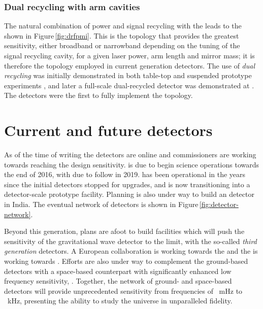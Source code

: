 \subsubsection{Dual recycling with \FP{} arm cavities}
The natural combination of power and signal recycling with the \FPMI{} leads to the \emph{\DRFPMI{}} shown in Figure\,\ref{fig:drfpmi}. This is the topology that provides the greatest sensitivity, either broadband or narrowband depending on the tuning of the signal recycling cavity, for a given laser power, arm length and mirror mass; it is therefore the topology employed in current generation detectors. The use of \emph{dual recycling} was initially demonstrated in both table-top and suspended prototype experiments \cite{Strain1991, Heinzel1998, Freise2000}, and later a full-scale dual-recycled \MI{} detector was demonstrated at \GEO{} \cite{Heinzel2002, Grote2004}. The \ALIGO{} detectors were the first to fully implement the \DRFPMI{} topology.

\section{Current and future detectors}
As of the time of writing the \ALIGO{} detectors are online and commissioners are working towards reaching the design sensitivity. \AVIRGO{} is due to begin science operations towards the end of 2016, with \KAGRA{} due to follow in 2019. \GEOHF{} has been operational in the years since the initial detectors stopped for upgrades, and is now transitioning into a detector-scale prototype facility. Planning is also under way to build an \ALIGO{} detector in India. The eventual network of detectors is shown in Figure\,\ref{fig:detector-network}.

Beyond this generation, plans are afoot to build facilities which will push the sensitivity of the gravitational wave detector to the limit, with the so-called \emph{third generation} detectors. A European collaboration is working towards the \emph{\ET{}} \cite{ET2011} and the \LSC{} is working towards \emph{\LIGOCE{}} \cite{Dwyer2015}. Efforts are also under way to complement the ground-based detectors with a space-based counterpart with significantly enhanced low frequency sensitivity, \emph{\ELISA{}} \cite{Amaro-Seoane2012}. Together, the network of ground- and space-based detectors will provide unprecedented sensitivity from frequencies of \SI{}{\milli\hertz} to \SI{}{\kilo\hertz}, presenting the ability to study the universe in unparalleled fidelity.

